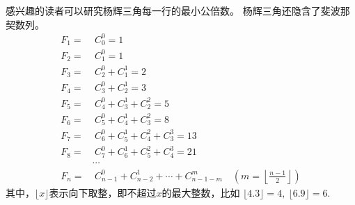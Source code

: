 \begin{itemize}[leftmargin=\inteval{\myitemleftmargin}pt,itemsep=
   \inteval{\myitemitempsep}pt,topsep=\inteval{\myitemtopsep}pt]
感兴趣的读者可以研究杨辉三角每一行的最小公倍数。
杨辉三角还隐含了斐波那契数列。
\begin{align*}
    F_1=&\  C_0^0=1 \\
    F_2=&\  C_1^0=1 \\
    F_3=&\  C_2^0+C_1^1=2 \\
    F_4=&\  C_3^0+C_2^1=3 \\
    F_5=&\  C_4^0+C_3^1+C_2^2=5 \\
    F_6=&\  C_5^0+C_4^1+C_3^2=8 \\
    F_7=&\  C_6^0+C_5^1+C_4^2+C_3^3=13 \\
    F_8=&\  C_7^0+C_6^1+C_5^2+C_4^3=21 \\ 
    &\cdots \\
    F_n=&\  C_{n-1}^0+C_{n-2}^1+\cdots+C_{n-1-m}^m\quad \left(m=\left\lfloor
    \frac{n-1}{2} \right\rfloor\right)   
\end{align*}
其中，$ \lfloor x \rfloor $表示向下取整，即不超过$ x $的最大整数，比如
$ \lfloor 4.3 \rfloor=4,\ \lfloor 6.9 \rfloor=6 $. 


\end{itemize}
